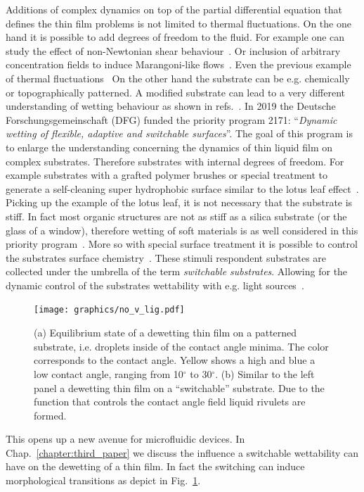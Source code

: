 Additions of complex dynamics on top of the partial differential equation that defines the thin film problems is not limited to thermal fluctuations.
On the one hand it is possible to add degrees of freedom to the fluid. 
For example one can study the effect of non-Newtonian shear behaviour~\cite{zhang2005non, myers2005application}. 
Or inclusion of arbitrary concentration fields to induce Marangoni-like flows~\cite{sultan_boudaoud_amar_2005, C5SM01603G, PhysRevLett.93.247803}.
Even the previous example of thermal fluctuations~\cite{Grun2006, Mecke_2005, PhysRevLett.95.244505, PhysRevE.104.034801}
On the other hand the substrate can be e.g. chemically or topographically patterned.
A modified substrate can lead to a very different understanding of wetting behaviour as shown in refs.~\cite{cassieWettabilityPorousSurfaces1944, WHYMAN2008355}.
In 2019 the Deutsche Forschungsgemeinschaft (DFG) funded the priority program 2171: ``\textit{Dynamic wetting of flexible, adaptive and switchable surfaces}''.
The goal of this program is to enlarge the understanding concerning the dynamics of thin liquid film on complex substrates.
Therefore substrates with internal degrees of freedom.
For example substrates with a grafted polymer brushes or special treatment to generate a self-cleaning super hydrophobic surface similar to the lotus leaf effect~\cite{doi:10.1021/acs.langmuir.0c03226, thiele2020gradient, doi:10.1021/acsnano.9b08211}.
Picking up the example of the lotus leaf, it is not necessary that the substrate is stiff.
In fact most organic structures are not as stiff as a silica substrate (or the glass of a window), therefore wetting of soft materials is as well considered in this priority program~\cite{doi:10.1146/annurev-fluid-010719-060147, https://doi.org/10.1002/nme.6567, chen2011short}.
More so with special surface treatment it is possible to control the substrates surface chemistry~\cite{xin2010reversibly, WANG200718}.
These stimuli respondent substrates are collected under the umbrella of the term \textit{switchable substrates}.
Allowing for the dynamic control of the substrates wettability with e.g. light sources~\cite{doi:10.1126/science.288.5471.1624, doi:10.1246/bcsj.20180076}.
\begin{figure}
    \centering
    \texttt{[image: graphics/no\_v\_lig.pdf]}
    \caption{(a) Equilibrium state of a dewetting thin film on a patterned substrate, i.e. droplets inside of the contact angle minima. 
    The color corresponds to the contact angle. 
    Yellow shows a high and blue a low contact angle, ranging from 10$^{\circ}$ to 30$^{\circ}$. 
    (b) Similar to the left panel a dewetting thin film on a ``switchable'' substrate. 
    Due to the function that controls the contact angle field liquid rivulets are formed.}
    \label{fig:morph_transition}
\end{figure}
This opens up a new avenue for microfluidic devices.
In Chap.~\ref{chapter:third_paper} we discuss the influence a switchable wettability can have on the dewetting of a thin film.
In fact the switching can induce morphological transitions as depict in Fig.~\ref{fig:morph_transition}. 

